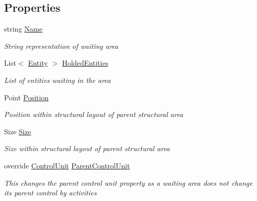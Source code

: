 \subsection*{Properties}
\begin{DoxyCompactItemize}
\item 
string \hyperlink{class_general_health_care_elements_1_1_entities_1_1_entity_waiting_area_ac42bea50a543ed5cdba65fcf65d4b670}{Name}
\begin{DoxyCompactList}\small\item\em String representation of waiting area \end{DoxyCompactList}\item 
List$<$ \hyperlink{class_simulation_core_1_1_h_c_c_m_elements_1_1_entity}{Entity} $>$ \hyperlink{class_general_health_care_elements_1_1_entities_1_1_entity_waiting_area_adfa8146025e3f525c57b443905256058}{Holded\+Entities}
\begin{DoxyCompactList}\small\item\em List of entities waiting in the area \end{DoxyCompactList}\item 
Point \hyperlink{class_general_health_care_elements_1_1_entities_1_1_entity_waiting_area_a0443a94e9b145288b9d7e9034513d9a3}{Position}
\begin{DoxyCompactList}\small\item\em Position within structural layout of parent structural area \end{DoxyCompactList}\item 
Size \hyperlink{class_general_health_care_elements_1_1_entities_1_1_entity_waiting_area_ac188423086574de63ddf76b800237976}{Size}
\begin{DoxyCompactList}\small\item\em Size within structural layout of parent structural area \end{DoxyCompactList}\item 
override \hyperlink{class_simulation_core_1_1_h_c_c_m_elements_1_1_control_unit}{Control\+Unit} \hyperlink{class_general_health_care_elements_1_1_entities_1_1_entity_waiting_area_ac6367fade46ede36bf515c1f3bcbe514}{Parent\+Control\+Unit}
\begin{DoxyCompactList}\small\item\em This changes the parent control unit property as a waiting area does not change its parent control by activities \end{DoxyCompactList}\end{DoxyCompactItemize}


